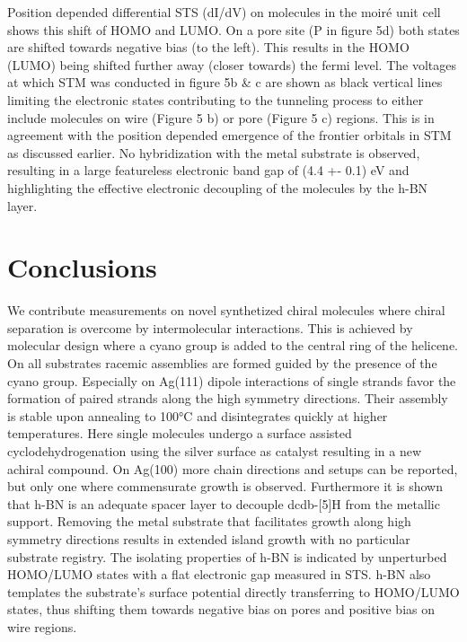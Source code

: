 Position depended differential STS (dI/dV) on molecules in the moiré unit cell shows this shift of HOMO and LUMO. On a pore site (P in figure 5d) both states are shifted towards negative bias (to the left). This results in the HOMO (LUMO) being shifted further away (closer towards) the fermi level. The voltages at which STM was conducted in figure 5b \& c are shown as black vertical lines limiting the electronic states contributing to the tunneling process to either include molecules on wire (Figure 5 b) or pore (Figure 5 c) regions. This is in agreement with the position depended emergence of the frontier orbitals in STM as discussed earlier. No hybridization with the metal substrate is observed, resulting in a large featureless electronic band gap of (4.4 +- 0.1) eV and highlighting the effective electronic decoupling of the molecules by the h-BN layer.


\section{Conclusions}

We contribute measurements on novel synthetized chiral molecules where chiral separation is overcome by intermolecular interactions. This is achieved by molecular design where a cyano group is added to the central ring of the helicene. On all substrates racemic assemblies are formed guided by the presence of the cyano group. Especially on Ag(111) dipole interactions of single strands favor the formation of paired strands along the high symmetry directions. Their assembly is stable upon annealing to 100°C and disintegrates quickly at higher temperatures. Here single molecules undergo a surface assisted cyclodehydrogenation using the silver surface as catalyst resulting in a new achiral compound. On Ag(100) more chain directions and setups can be reported, but only one where commensurate growth is observed. Furthermore it is shown that h-BN is an adequate spacer layer to decouple dcdb-[5]H from the metallic support. Removing the metal substrate that facilitates growth along high symmetry directions results in extended island growth with no particular substrate registry. The isolating properties of h-BN is indicated by unperturbed HOMO/LUMO states with a flat electronic gap measured in STS. h-BN also templates the substrate’s surface potential directly transferring to HOMO/LUMO states, thus shifting them towards negative bias on pores and positive bias on wire regions. 
